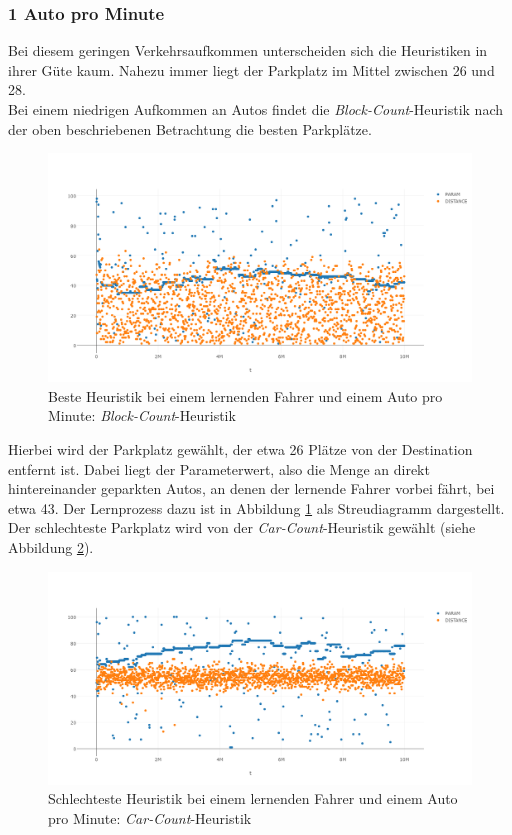 \subsubsection{1 Auto pro Minute}
Bei diesem geringen Verkehrsaufkommen unterscheiden sich die Heuristiken in ihrer Güte kaum. Nahezu immer liegt der Parkplatz im Mittel zwischen 26 und 28.\\
Bei einem niedrigen Aufkommen an Autos findet die \emph{Block-Count}-Heuristik nach der oben beschriebenen Betrachtung die besten Parkplätze.
\begin{figure}
	\includegraphics[width=\textwidth]{analyse/SingleMutant/blockcount1.png}
	\caption{Beste Heuristik bei einem lernenden Fahrer und einem Auto pro Minute: \emph{Block-Count}-Heuristik}\label{fig:res_sm_1pm_best}
\end{figure}
Hierbei wird der Parkplatz gewählt, der etwa 26  Plätze von der Destination entfernt ist. Dabei liegt der Parameterwert, also die Menge an direkt hintereinander geparkten Autos, an denen der lernende Fahrer vorbei fährt, bei etwa 43. Der Lernprozess dazu ist in Abbildung \ref{fig:res_sm_1pm_best} als Streudiagramm dargestellt.\\
Der schlechteste Parkplatz wird von der \emph{Car-Count}-Heuristik gewählt (siehe Abbildung \ref{fig:res_sm_1pm_worst}). 
\begin{figure}
	\includegraphics[width=\textwidth]{analyse/SingleMutant/carcount1.png}
	\caption{Schlechteste Heuristik bei einem lernenden Fahrer und einem Auto pro Minute: \emph{Car-Count}-Heuristik}\label{fig:res_sm_1pm_worst}
\end{figure}
